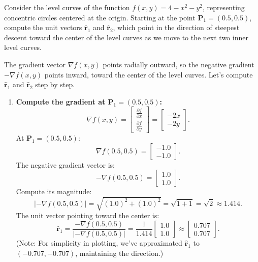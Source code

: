 \exampleline
\begin{example}
Consider the level curves of the function \( f(x, y) = 4 - x^2 - y^2 \), representing concentric circles centered at the origin. Starting at the point \( \mathbf{P}_1 = (0.5, 0.5) \), compute the unit vectors \( \hat{\mathbf{r}}_1 \) and \( \hat{\mathbf{r}}_2 \), which point in the direction of steepest descent toward the center of the level curves as we move to the next two inner level curves.

\begin{solution}
\noindent The gradient vector \( \nabla f(x, y) \) points radially outward, so the negative gradient \( -\nabla f(x, y) \) points inward, toward the center of the level curves. Let's compute \( \hat{\mathbf{r}}_1 \) and \( \hat{\mathbf{r}}_2 \) step by step.

\begin{enumerate}
    \item \textbf{Compute the gradient at \( \mathbf{P}_1 = (0.5, 0.5) \):}
    \[
    \nabla f(x, y) = \begin{bmatrix} \frac{\partial f}{\partial x} \\ \frac{\partial f}{\partial y} \end{bmatrix} = \begin{bmatrix} -2x \\ -2y \end{bmatrix}.
    \]
    At \( \mathbf{P}_1 = (0.5, 0.5) \):
    \[
    \nabla f(0.5, 0.5) = \begin{bmatrix} -1.0 \\ -1.0 \end{bmatrix}.
    \]
    The negative gradient vector is:
    \[
    -\nabla f(0.5, 0.5) = \begin{bmatrix} 1.0 \\ 1.0 \end{bmatrix}.
    \]
    Compute its magnitude:
    \[
    |-\nabla f(0.5, 0.5)| = \sqrt{(1.0)^2 + (1.0)^2} = \sqrt{1 + 1} = \sqrt{2} \approx 1.414.
    \]
    The unit vector pointing toward the center is:
    \[
    \hat{\mathbf{r}}_1 = \frac{-\nabla f(0.5, 0.5)}{|-\nabla f(0.5, 0.5)|} = \frac{1}{1.414} \begin{bmatrix} 1.0 \\ 1.0 \end{bmatrix} \approx \begin{bmatrix} 0.707 \\ 0.707 \end{bmatrix}.
    \]
    (Note: For simplicity in plotting, we've approximated \( \hat{\mathbf{r}}_1 \) to \( (-0.707, -0.707) \), maintaining the direction.)


\end{enumerate}
\end{solution}
\end{example}
